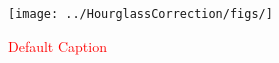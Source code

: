 \begin{figure}
\begin{center}
\texttt{[image: ../HourglassCorrection/figs/]}
\caption{ \textcolor{red}{Default Caption} }
\label{fig:}
\end{center}
\end{figure}